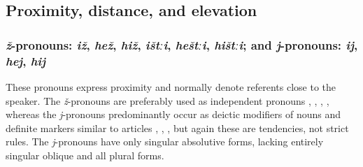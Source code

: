 \subsection{Proximity, distance, and elevation}
\label{ssec:Proximity, distance, cardinal directions, and height The six horizontal series}



\subsubsection{\textit{ž}-pronouns: \textit{iž}, \textit{hež}, \textit{hiž}, \textit{ištːi}, \textit{heštːi}, \textit{hištːi}; and \textit{j}-pronouns: \textit{ij}, \textit{hej}, \textit{hij}}
\label{sssec:z-pronouns j-pronouns}

These pronouns express proximity and normally denote referents close to the speaker. The \textit{ž}-pronouns are preferably used as independent pronouns , , , , whereas the \textit{j}-pronouns predominantly occur as deictic modifiers of nouns and definite markers similar to articles , , , but again these are tendencies, not strict rules. The \textit{j}-pronouns have only singular absolutive forms, lacking entirely singular oblique and all plural forms.

